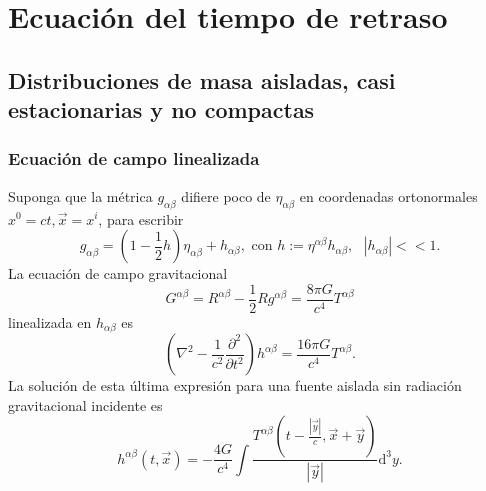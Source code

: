 \section{Ecuación del tiempo de retraso}
\subsection{Distribuciones de masa aisladas, casi estacionarias y no compactas}
\subsubsection{Ecuación de campo linealizada}
Suponga que la métrica $g_{\alpha\beta}$ difiere poco de $\eta_{\alpha\beta}$ en coordenadas ortonormales $x^0=ct, \vec{x}=x^i$, para escribir
\begin{equation}\label{metricApprox}
g_{\alpha\beta}=\left( 1-\frac{1}{2}h\right)\eta_{\alpha\beta}+h_{\alpha\beta}, \text{ con }h:=\eta^{\alpha\beta}h_{\alpha\beta}, \text{ }|h_{\alpha\beta}|<<1.
\end{equation} 
La ecuación de campo gravitacional
\begin{equation}
G^{\alpha\beta}=R^{\alpha\beta}-\frac{1}{2}Rg^{\alpha\beta}=\frac{8\pi G}{c^4}T^{\alpha\beta}
\end{equation}
linealizada en $h_{\alpha\beta}$ es
\begin{equation}
\left(\nabla^2-\frac{1}{c^2}\frac{\partial^2}{\partial t^2}\right) h^{\alpha\beta} = \frac{16\pi G}{c^4}T^{\alpha\beta}.
\end{equation}
La solución de esta última expresión para una fuente aislada sin radiación gravitacional incidente es
\begin{equation}\label{retarded1}
h^{\alpha\beta}(t,\vec{x}) = -\frac{4G}{c^4}\int \frac{T^{\alpha\beta}(t-\frac{|\vec{y}|}{c}, \vec{x}+\vec{y})}{|\vec{y}|}\mathrm{d}^3y.
\end{equation}
